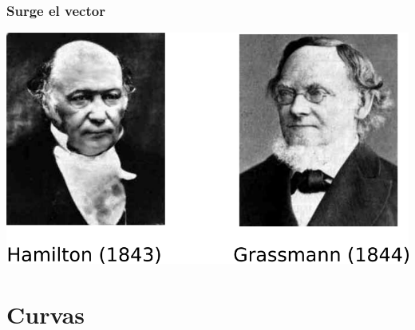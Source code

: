 \documentclass{beamer}
\begin{document}
\begin{frame}
    \frametitle{Surge el vector}
    \includegraphics[width=\textwidth]{../gfx/hamilton-grassmann}
\end{frame}

\section{Curvas}
\end{document}

